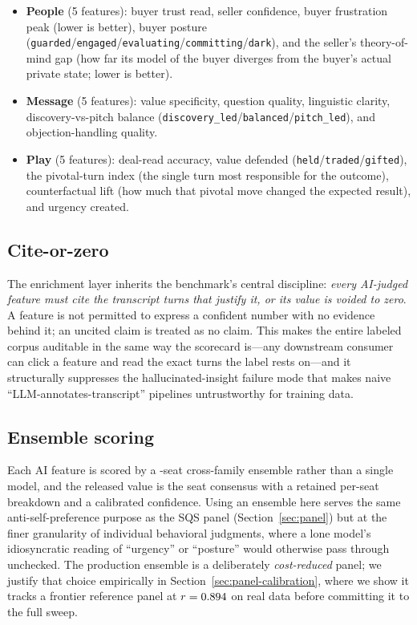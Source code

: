 \begin{itemize}[leftmargin=1.4em,itemsep=2pt,topsep=2pt]
  \item \textbf{People} (5 features): buyer trust read, seller confidence, buyer
  frustration peak (lower is better), buyer posture
  (\texttt{guarded}/\texttt{engaged}/\texttt{evaluating}/\texttt{committing}/\texttt{dark}),
  and the seller's theory-of-mind gap (how far its model of the buyer diverges
  from the buyer's actual private state; lower is better).
  \item \textbf{Message} (5 features): value specificity, question quality,
  linguistic clarity, discovery-vs-pitch balance
  (\texttt{discovery\_led}/\texttt{balanced}/\texttt{pitch\_led}), and
  objection-handling quality.
  \item \textbf{Play} (5 features): deal-read accuracy, value defended
  (\texttt{held}/\texttt{traded}/\texttt{gifted}), the pivotal-turn index (the
  single turn most responsible for the outcome), counterfactual lift (how much
  that pivotal move changed the expected result), and urgency created.
\end{itemize}

\subsection{Cite-or-zero}
\label{sec:cite-or-zero}
The enrichment layer inherits the benchmark's central discipline: \emph{every
AI-judged feature must cite the transcript turns that justify it, or its value is
voided to zero}. A feature is not permitted to express a confident number with no
evidence behind it; an uncited claim is treated as no claim. This makes the entire
labeled corpus auditable in the same way the scorecard is---any downstream
consumer can click a feature and read the exact turns the label rests on---and it
structurally suppresses the hallucinated-insight failure mode that makes naive
``LLM-annotates-transcript'' pipelines untrustworthy for training data.

\subsection{Ensemble scoring}
Each AI feature is scored by a \numEnrichSeats{}-seat cross-family ensemble rather
than a single model, and the released value is the seat consensus with a retained
per-seat breakdown and a calibrated confidence. Using an ensemble here serves the
same anti-self-preference purpose as the SQS panel (Section~\ref{sec:panel}) but
at the finer granularity of individual behavioral judgments, where a lone model's
idiosyncratic reading of ``urgency'' or ``posture'' would otherwise pass through
unchecked. The production ensemble is a deliberately \emph{cost-reduced} panel; we
justify that choice empirically in Section~\ref{sec:panel-calibration}, where we
show it tracks a frontier reference panel at $r=0.894{}$ on real data
before committing it to the full sweep.

